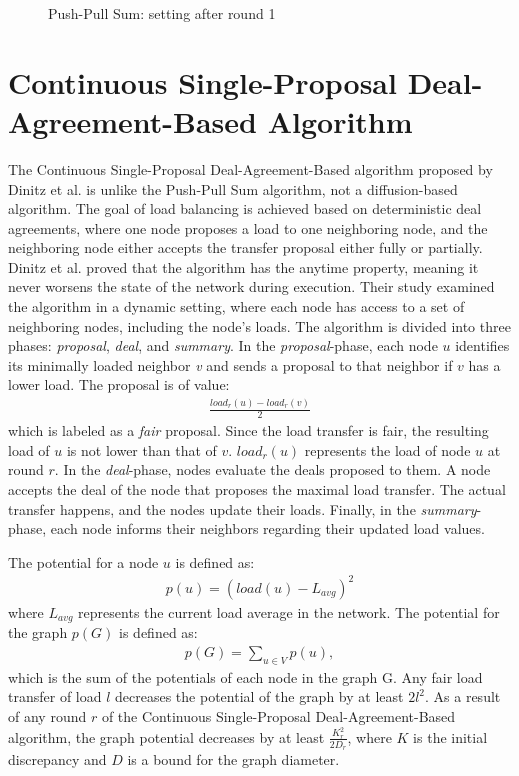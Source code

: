 \begin{figure}
    \centering
    \scalebox{0.75}{}
    \caption{Push-Pull Sum: setting after round 1}
    \label{fig:examplePPSResult}
\end{figure}

\section{Continuous Single-Proposal Deal-Agreement-Based Algorithm}\label{sec:singleproposalDAB}
The Continuous Single-Proposal Deal-Agreement-Based algorithm proposed by Dinitz et al. \cite{Dinitz2023DAB} is unlike the Push-Pull Sum algorithm, not a diffusion-based algorithm. The goal of load balancing is achieved based on deterministic deal agreements, where one node proposes a load to one neighboring node, and the neighboring node either accepts the transfer proposal either fully or partially. Dinitz et al. proved that the algorithm has the anytime property, meaning it never worsens the state of the network during execution. Their study examined the algorithm in a dynamic setting, where each node has access to a set of neighboring nodes, including the node's loads. The algorithm is divided into three phases: \textit{proposal}, \textit{deal}, and \textit{summary}. In the \textit{proposal}-phase, each node $u$ identifies its minimally loaded neighbor \textit{v} and sends a proposal to that neighbor if $v$ has a lower load. The proposal is of value:
\begin{align}
    \frac{load_{r}(u)-load_{r}(v)}{2}    
\end{align}
which is labeled as a \textit{fair} proposal. Since the load transfer is fair, the resulting load of $u$ is not lower than that of $v$. $load_{r}(u)$ represents the load of node $u$ at round $r$. In the \textit{deal}-phase, nodes evaluate the deals proposed to them. A node accepts the deal of the node that proposes the maximal load transfer. The actual transfer happens, and the nodes update their loads. Finally, in the \textit{summary}-phase, each node informs their neighbors regarding their updated load values. \cite{Dinitz2023DAB}



The potential for a node $u$ is defined as:
\begin{align}
    p(u) = (load(u)-L_{avg})^{2}    
\end{align}
where $L_{avg}$ represents the current load average in the network. The potential for the graph $p(G)$ is defined as:
\begin{align}
    p(G)=\sum_{u\in V}{p(u)},   
\end{align}
which is the sum of the potentials of each node in the graph G. Any fair load transfer of load $l$ decreases the potential of the graph by at least $2l^{2}$. As a result of any round $r$ of the Continuous Single-Proposal Deal-Agreement-Based algorithm, the graph potential decreases by at least $\frac{K^{2}_r}{2D_r}$, where $K$ is the initial discrepancy and $D$ is a bound for the graph diameter. \cite{Dinitz2023DAB}

